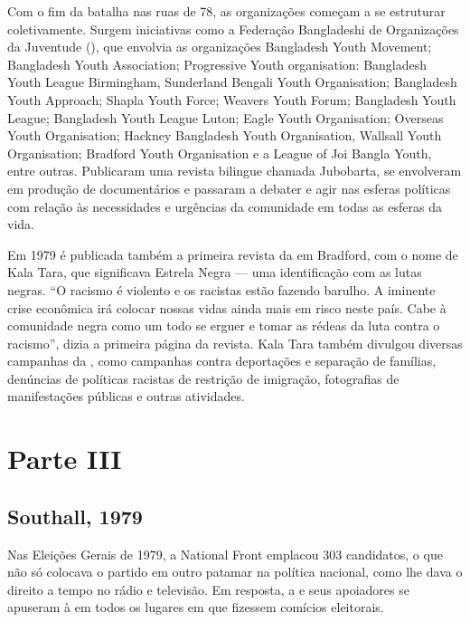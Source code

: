 Com o fim da batalha nas ruas de 78, as organizações começam a se estruturar coletivamente. Surgem iniciativas como a Federação Bangladeshi de Organizações da Juventude (), que envolvia as organizações Bangladesh Youth Movement; Bangladesh Youth Association; Progressive Youth organisation: Bangladesh Youth League Birmingham, Sunderland Bengali Youth Organisation; Bangladesh Youth Approach; Shapla Youth Force; Weavers Youth Forum; Bangladesh Youth League; Bangladesh Youth League Luton; Eagle Youth Organisation; Overseas Youth Organisation; Hackney Bangladesh Youth Organisation, Wallsall Youth Organisation; Bradford Youth Organisation e a League of Joi Bangla Youth, entre outras. Publicaram uma revista bilingue chamada Jubobarta, se envolveram em produção de documentários e passaram a debater e agir nas esferas políticas com relação às necessidades e urgências da comunidade em todas as esferas da vida.


Em 1979 é publicada também a primeira revista da  em Bradford, com o nome de Kala Tara, que significava Estrela Negra --- uma identificação com as lutas negras. ``O racismo é violento e os racistas estão fazendo barulho. A iminente crise econômica irá colocar nossas vidas ainda mais em risco neste país. Cabe à comunidade negra como um todo se erguer e tomar as rédeas da luta contra o racismo'', dizia a primeira página da revista. Kala Tara também divulgou diversas campanhas da , como campanhas contra deportações e separação de famílias, denúncias de políticas racistas de restrição de imigração, fotografias de manifestações públicas e outras atividades.

\section{Parte III}

\subsection{Southall, 1979}

Nas Eleições Gerais de 1979, a National Front emplacou 303 candidatos, o que não só colocava o partido em outro patamar na política nacional, como lhe dava o direito a tempo no rádio e televisão. Em resposta, a  e seus apoiadores se apuseram à  em todos os lugares em que fizessem comícios eleitorais.

